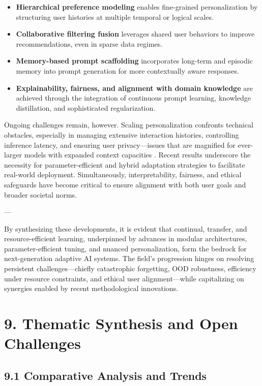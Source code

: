 \documentclass[11pt]{article}
\begin{document}
\begin{itemize}
    \item \textbf{Hierarchical preference modeling} enables fine-grained personalization by structuring user histories at multiple temporal or logical scales.
    \item \textbf{Collaborative filtering fusion} leverages shared user behaviors to improve recommendations, even in sparse data regimes.
    \item \textbf{Memory-based prompt scaffolding} incorporates long-term and episodic memory into prompt generation for more contextually aware responses.
    \item \textbf{Explainability, fairness, and alignment with domain knowledge} are achieved through the integration of continuous prompt learning, knowledge distillation, and sophisticated regularization.
\end{itemize}

Ongoing challenges remain, however. Scaling personalization confronts technical obstacles, especially in managing extensive interaction histories, controlling inference latency, and ensuring user privacy—issues that are magnified for ever-larger models with expanded context capacities \cite{ref5,ref24,ref55}. Recent results underscore the necessity for parameter-efficient and hybrid adaptation strategies to facilitate real-world deployment. Simultaneously, interpretability, fairness, and ethical safeguards have become critical to ensure alignment with both user goals and broader societal norms.

---

By synthesizing these developments, it is evident that continual, transfer, and resource-efficient learning, underpinned by advances in modular architectures, parameter-efficient tuning, and nuanced personalization, form the bedrock for next-generation adaptive AI systems. The field’s progression hinges on resolving persistent challenges—chiefly catastrophic forgetting, OOD robustness, efficiency under resource constraints, and ethical user alignment—while capitalizing on synergies enabled by recent methodological innovations.

\section{9. Thematic Synthesis and Open Challenges}

\subsection{9.1 Comparative Analysis and Trends}
\end{document}
